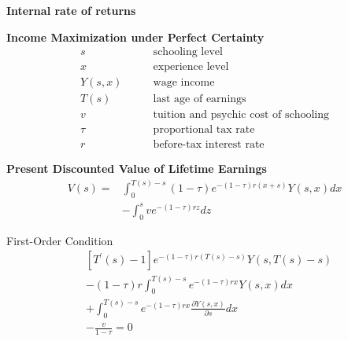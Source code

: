 \begin{frame}\begin{center}
\LARGE\textbf{Internal rate of returns}
\end{center}\end{frame}
\begin{frame}
\textbf{Income Maximization under Perfect Certainty \nocite{Rosen.1977,Willis.1979}}
\begin{align*}
s               &\qquad\text{schooling level} \\
x               &\qquad\text{experience level} \\
Y(s, x)         &\qquad\text{wage income} \\
T(s)            &\qquad\text{last age of earnings} \\
v               &\qquad\text{tuition and psychic cost of schooling} \\
\tau            &\qquad\text{proportional tax rate} \\
r               &\qquad\text{before-tax interest rate}
\end{align*}
\end{frame}
\begin{frame}
\textbf{Present Discounted Value of Lifetime Earnings}
\begin{align*}
V(s) = & \int_0^{T(s) - s} (1 - \tau) e^{-(1 - \tau)r(x + s)} Y(s,x) dx \\
       & - \int^s_0 ve^{-(1 - \tau)rz}dz
\end{align*}
\end{frame}
\begin{frame}
First-Order Condition
\begin{align*}
& [T^\prime(s) - 1]e^{-(1 - \tau)r(T(s) - s)} Y(s, T(s) - s) \\
& - (1 - \tau)r\int^{T(s) - s}_0 e^{-(1 - \tau)rx} Y(s, x)dx \\
& + \int_0^{T(s) - s} e^{-(1 - \tau) rx} \frac{\partial Y(s, x)}{\partial s}dx \\
& - \frac{v}{ 1  -\tau} = 0
\end{align*}
\end{frame}
